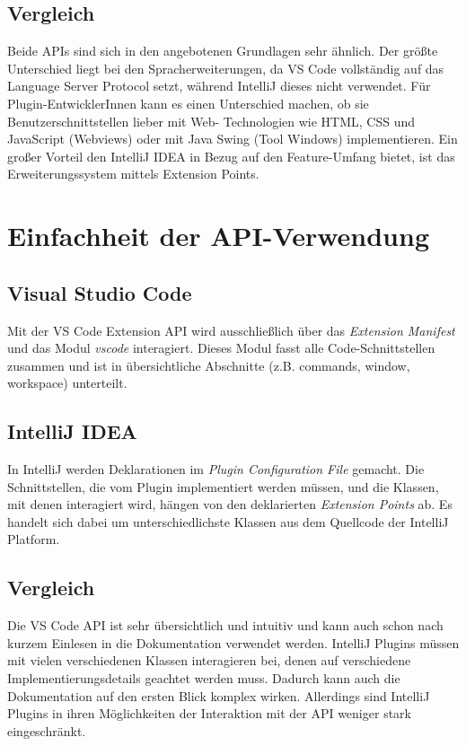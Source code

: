 \subsection{Vergleich}

Beide APIs sind sich in den angebotenen Grundlagen sehr ähnlich.
Der größte Unterschied liegt bei den Spracherweiterungen, da VS Code 
vollständig auf das Language Server Protocol setzt, während IntelliJ
dieses nicht verwendet. Für Plugin-EntwicklerInnen
kann es einen Unterschied machen, ob sie Benutzerschnittstellen
lieber mit Web-\linebreak 
Technologien wie HTML, CSS und JavaScript (Webviews) oder
mit Java Swing (Tool Windows) implementieren. 
Ein großer Vorteil den IntelliJ IDEA in Bezug auf den Feature-Umfang
bietet, ist das Erweiterungssystem mittels Extension Points.


\section{Einfachheit der API-Verwendung}
\label{sec:Vergleich_Intuitivität}

\subsection{Visual Studio Code}

Mit der VS Code Extension API wird ausschließlich
über das \emph{Extension Manifest} und das Modul \emph{vscode} interagiert.
Dieses Modul fasst alle Code-Schnittstellen zusammen und ist
in übersichtliche Abschnitte (z.B. commands, window, workspace) unterteilt.

\subsection{IntelliJ IDEA}

In IntelliJ werden Deklarationen im \emph{Plugin Configuration File} gemacht.
Die Schnittstellen, die vom Plugin implementiert werden müssen, und
die Klassen, mit denen interagiert wird, hängen von den deklarierten
\emph{Extension Points} ab. Es handelt sich dabei um unterschiedlichste
Klassen aus dem Quellcode der IntelliJ Platform.

\subsection{Vergleich}

Die VS Code API ist sehr übersichtlich und intuitiv und kann auch
schon nach kurzem Einlesen in die Dokumentation verwendet werden.
IntelliJ Plugins müssen mit vielen verschiedenen Klassen interagieren
bei, denen auf verschiedene Implementierungsdetails geachtet werden muss.
Dadurch kann auch die Dokumentation auf den ersten Blick komplex
wirken. Allerdings sind IntelliJ Plugins in ihren Möglichkeiten der
Interaktion mit der API weniger stark eingeschränkt.


